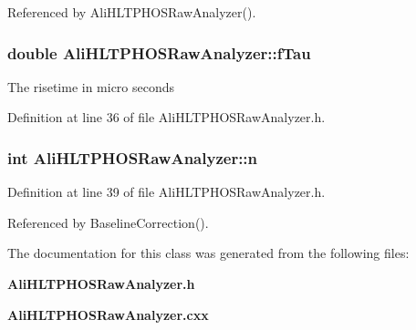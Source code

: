 Referenced by Ali\-HLTPHOSRaw\-Analyzer().
\subsubsection{\setlength{\rightskip}{0pt plus 5cm}double {\bf Ali\-HLTPHOSRaw\-Analyzer::f\-Tau}\hspace{0.3cm}{\tt  [protected]}}\label{classAliHLTPHOSRawAnalyzer_AliHLTPHOSRawAnalyzerPeakFinderp4}


The risetime in micro seconds 

Definition at line 36 of file Ali\-HLTPHOSRaw\-Analyzer.h.
\subsubsection{\setlength{\rightskip}{0pt plus 5cm}int {\bf Ali\-HLTPHOSRaw\-Analyzer::n}\hspace{0.3cm}{\tt  [protected]}}\label{classAliHLTPHOSRawAnalyzer_AliHLTPHOSRawAnalyzerPeakFinderp7}




Definition at line 39 of file Ali\-HLTPHOSRaw\-Analyzer.h.

Referenced by Baseline\-Correction().

The documentation for this class was generated from the following files:\begin{CompactItemize}
\item 
{\bf Ali\-HLTPHOSRaw\-Analyzer.h}\item 
{\bf Ali\-HLTPHOSRaw\-Analyzer.cxx}\end{CompactItemize}
